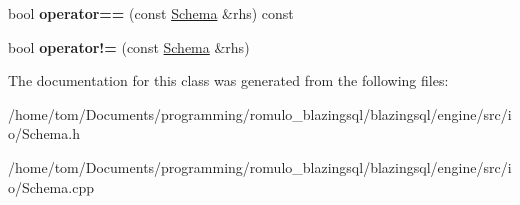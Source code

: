 \begin{DoxyCompactItemize}
\item 
\mbox{\label{classral_1_1io_1_1Schema_afee4e891bb45e62cf51b68252f08e35f}} 
bool {\bfseries operator==} (const \hyperlink{classral_1_1io_1_1Schema}{Schema} \&rhs) const
\item 
\mbox{\label{classral_1_1io_1_1Schema_a7918d0f7e65ce804258a59901c8911a3}} 
bool {\bfseries operator!=} (const \hyperlink{classral_1_1io_1_1Schema}{Schema} \&rhs)
\end{DoxyCompactItemize}


The documentation for this class was generated from the following files\+:\begin{DoxyCompactItemize}
\item 
/home/tom/\+Documents/programming/romulo\+\_\+blazingsql/blazingsql/engine/src/io/Schema.\+h\item 
/home/tom/\+Documents/programming/romulo\+\_\+blazingsql/blazingsql/engine/src/io/Schema.\+cpp\end{DoxyCompactItemize}

